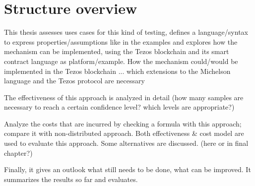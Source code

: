 
\section{Structure overview}
This thesis assesses uses cases for this kind of testing, defines a language/syntax to express properties/assumptions like in the examples and explores how the mechanism can be implemented, using the Tezos blockchain and its smart contract language as platform/example. 
How the mechanism could/would be implemented in the Tezos blockchain ...
which extensions to the Michelson language and the Tezos protocol are necessary

The effectiveness of this approach is analyzed in detail (how many samples are necessary to reach a certain confidence level? which levels are appropriate?)

Analyze the costs that are incurred by checking a formula with this approach; compare it with non-distributed approach.
Both effectiveness \& cost model are used to evaluate this approach. Some alternatives are discussed. (here or in final chapter?)

Finally, it gives an outlook what still needs to be done, what can be improved. It summarizes the results so far and evaluates.





